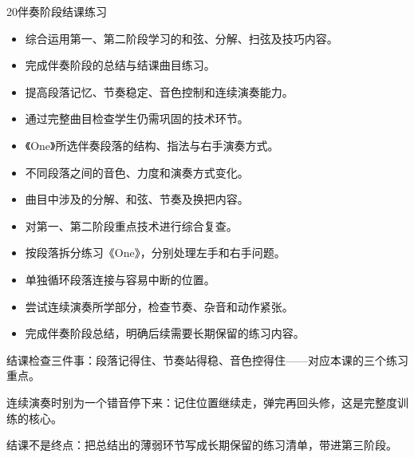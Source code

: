 \begin{lessoncard}{20}{伴奏阶段结课练习}
\begin{itemize}
\item 综合运用第一、第二阶段学习的和弦、分解、扫弦及技巧内容。
\item 完成伴奏阶段的总结与结课曲目练习。
\item 提高段落记忆、节奏稳定、音色控制和连续演奏能力。
\item 通过完整曲目检查学生仍需巩固的技术环节。
\end{itemize}
\begin{itemize}
\item 《One》所选伴奏段落的结构、指法与右手演奏方式。
\item 不同段落之间的音色、力度和演奏方式变化。
\item 曲目中涉及的分解、和弦、节奏及换把内容。
\item 对第一、第二阶段重点技术进行综合复查。
\end{itemize}
\begin{itemize}
\item 按段落拆分练习《One》，分别处理左手和右手问题。
\item 单独循环段落连接与容易中断的位置。
\item 尝试连续演奏所学部分，检查节奏、杂音和动作紧张。
\item 完成伴奏阶段总结，明确后续需要长期保留的练习内容。
\end{itemize}
\begin{fignote}
\begin{center}
\end{center}
\begin{fignotes}
\item 结课检查三件事：段落记得住、节奏站得稳、音色控得住——对应本课的三个练习重点。
\item 连续演奏时别为一个错音停下来：记住位置继续走，弹完再回头修，这是完整度训练的核心。
\item 结课不是终点：把总结出的薄弱环节写成长期保留的练习清单，带进第三阶段。
\end{fignotes}
\end{fignote}
\end{lessoncard}
